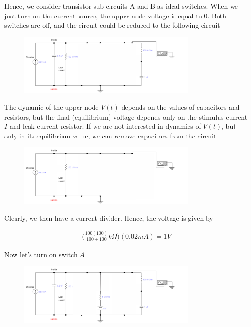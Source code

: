 \documentclass[12]{amsbook}
\newcommand\0{\mathbf{0}}
\newcommand\<{\langle}
\renewcommand\>{\rangle}
\begin{document}
Hence, we consider transistor sub-circuits A and B as ideal switches. When we just turn on the current source, the upper node voltage is equal to 0. Both switches are off, and the circuit could be reduced to the following circuit
 
 \begin{figure}[H]
\includegraphics[width=0.8\textwidth]{exercise1-1}
\end{figure}

The dynamic of the upper node $V(t)$ depends on the values of capacitors and resistors, but the final (equilibrium) voltage depends only on the stimulus current $I$ and leak current resistor. If we are not interested in dynamics of $V(t)$, but only in its equilibrium value, we can remove capacitors from the circuit.
 
 \begin{figure}[H]
\includegraphics[width=0.8\textwidth]{exercise1-2}
\end{figure}

Clearly, we then have a current divider. Hence, the voltage is given by 

\begin{align*}
\Big(\frac{100(100)}{100 + 100}k\Omega\Big) (0.02 mA) = 	1 V
\end{align*}


Now let's turn on switch $A$
 
 \begin{figure}[H]
\includegraphics[width=0.8\textwidth]{exercise1-3}
\end{figure}
\end{document}
